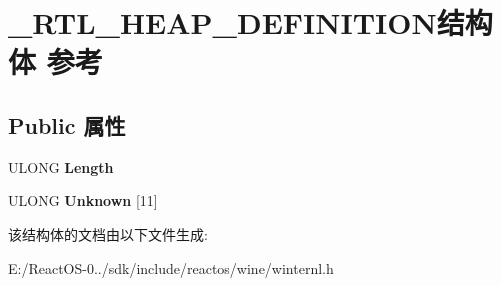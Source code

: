\hypertarget{struct___r_t_l___h_e_a_p___d_e_f_i_n_i_t_i_o_n}{}\section{\+\_\+\+R\+T\+L\+\_\+\+H\+E\+A\+P\+\_\+\+D\+E\+F\+I\+N\+I\+T\+I\+O\+N结构体 参考}
\label{struct___r_t_l___h_e_a_p___d_e_f_i_n_i_t_i_o_n}
\subsection*{Public 属性}
\begin{DoxyCompactItemize}
\item 
\mbox{\label{struct___r_t_l___h_e_a_p___d_e_f_i_n_i_t_i_o_n_a9c16ad9775b24adb23493525dc15859c}} 
U\+L\+O\+NG {\bfseries Length}
\item 
\mbox{\label{struct___r_t_l___h_e_a_p___d_e_f_i_n_i_t_i_o_n_a998e3ca085bb789aa1a56b4df5ece9bc}} 
U\+L\+O\+NG {\bfseries Unknown} \mbox{[}11\mbox{]}
\end{DoxyCompactItemize}


该结构体的文档由以下文件生成\+:\begin{DoxyCompactItemize}
\item 
E\+:/\+React\+O\+S-\/0../sdk/include/reactos/wine/winternl.\+h\end{DoxyCompactItemize}
